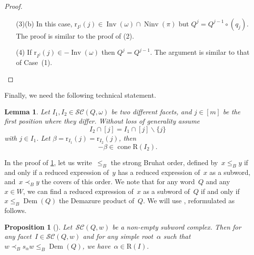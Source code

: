 \documentclass[reqno]{amsart}
\newtheorem{proposition}[theorem]{Proposition}
\newtheorem{lemma}[theorem]{Lemma}
\theoremstyle{definition}
\newcommand{\ssm}{\smallsetminus} %
\DeclareMathOperator{\cone}{cone} %
\DeclareMathOperator{\Inv}{Inv} %
\DeclareMathOperator{\Ninv}{Ninv} %
\DeclareMathOperator{\DemazureProduct}{Dem} %
\newcommand{\subwordComplex}{\mathcal{SC}} %
\newcommand{\Roots}{\mathrm{R}} %
\newcommand{\rootFunction}[2]{\mathrm{r}_{#1}(#2)} %
\begin{document}
\begin{proof}
\begin{enumerate}
    \item[(3)(b)] In this case, $\rootFunction{I^j}{j}\in \Inv(\omega) \cap \Ninv(\pi)$ but $Q^j= Q^{j-1}\circ (q_j)$. The proof is similar to the proof of (2).

    \item[(4)] If $\rootFunction{I^j}{j}\in -\Inv(\omega)$ then $Q^j=Q^{j-1}$. The argument is similar to that of Case~(1).
    \qedhere
    \end{enumerate}
\end{proof}

Finally, we need the following technical statement.

\begin{lemma}
\label{lem:sweeping3}
Let $I_1,I_2\in \subwordComplex(Q,\omega)$ be two different facets, and $j\in [m]$ be the first position where they differ.
Without loss of generality assume 
\[
I_2\cap [j] = I_1\cap [j] \ssm \{j\}
\]
with $j\in I_1$.
Let $\beta=\rootFunction{I_1}{j}=\rootFunction{I_2}{j}$, then 
\[
-\beta \in \cone \Roots(I_2).
\]
\end{lemma}

In the proof of \cref{lem:sweeping3}, let us write~$\leqslant_B$ the strong Bruhat order, defined by~$x \leqslant_B y$ if and only if a reduced expression of~$y$ has a reduced expression of~$x$ as a subword, and~$x \prec_B y$ the covers of this order. We note that for any word~$Q$ and any~$x\in W$, we can find a reduced expression of~$x$ as a subword of~$Q$ if and only if~$x \leqslant_B \DemazureProduct(Q)$ the Demazure product of~$Q$.
We will use \cite[Proposition 3.14]{JahnStump}, reformulated as follows.

\begin{proposition}[\cite{JahnStump}]\label{prop:JSDemazureCone}
Let~$\subwordComplex(Q,w)$ be a non-empty subword complex. Then for any facet~$I \in \subwordComplex(Q,w)$ and for any simple root~$\alpha$ such that~$w \prec_B s_\alpha w \leqslant_B \DemazureProduct(Q)$, we have~$\alpha \in \Roots(I)$.
\end{proposition}
\end{document}
